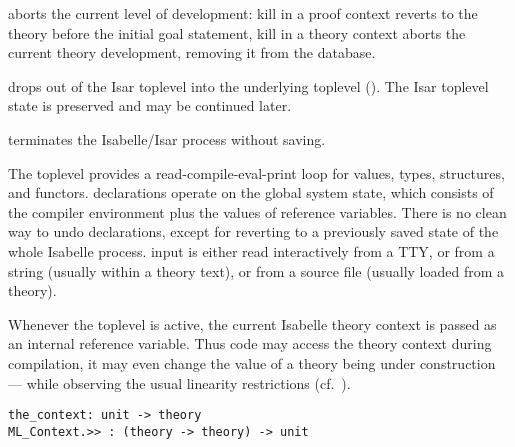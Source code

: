 \begin{isabellebody}
\begin{isamarkuptext}
\begin{description}
  \item {} aborts the current level of development:
  kill in a proof context reverts to the theory before the initial
  goal statement, kill in a theory context aborts the current theory
  development, removing it from the database.

  \item {} drops out of the Isar toplevel into the
  underlying {\ML} toplevel ().  The Isar
  toplevel state is preserved and may be continued later.

  \item {} terminates the Isabelle/Isar process without
  saving.

  \end{description}%
\end{isamarkuptext}%
\isamarkuptrue%
%
\isamarkuptrue%
%
\begin{isamarkuptext}%
The {\ML} toplevel provides a read-compile-eval-print loop for {\ML}
  values, types, structures, and functors.  {\ML} declarations operate
  on the global system state, which consists of the compiler
  environment plus the values of {\ML} reference variables.  There is
  no clean way to undo {\ML} declarations, except for reverting to a
  previously saved state of the whole Isabelle process.  {\ML} input
  is either read interactively from a TTY, or from a string (usually
  within a theory text), or from a source file (usually loaded from a
  theory).

  Whenever the {\ML} toplevel is active, the current Isabelle theory
  context is passed as an internal reference variable.  Thus {\ML}
  code may access the theory context during compilation, it may even
  change the value of a theory being under construction --- while
  observing the usual linearity restrictions
  (cf.~).%
\end{isamarkuptext}%
\isamarkuptrue%
%
\isadelimmlref
%
\endisadelimmlref
%
\isatagmlref
%
\begin{isamarkuptext}%
\begin{mldecls}
  \verb|the_context: unit -> theory| \\
  \verb|ML_Context.>> : (theory -> theory) -> unit| \\
  \end{mldecls}

  \begin{description}


\end{description}
\end{isamarkuptext}
\end{isabellebody}
